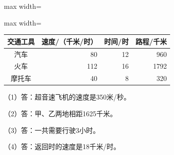 
\begingroup\color{answerred}\par\smallskip\noindent\begin{adjustbox}{max width=\linewidth}\begin{adjustbox}{max width=\linewidth}\begin{tabular}{c|rrr}
\hline
交通工具&速度/（千米/时）&时间/时&路程/千米\\\hline
汽车&80&12&960\\
火车&112&16&1792\\
摩托车&40&8&320\\\hline
\end{tabular}\end{adjustbox}\end{adjustbox}\par\smallskip\par\endgroup
{}
\begingroup\color{answerred}\noindent（1）答：超音速飞机的速度是350米/秒。\par
\noindent（2）答：甲、乙两地相距1625千米。\par
\noindent（3）答：一共需要行驶3小时。\par
\noindent（4）答：返回时的速度是18千米/时。\par\par\endgroup
